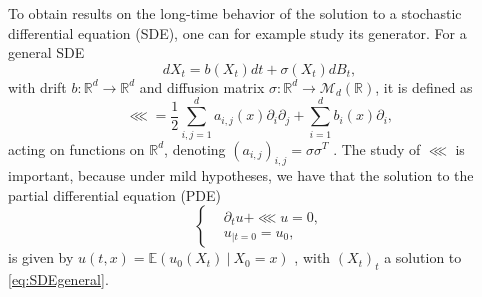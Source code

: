 \documentclass[12pt]{amsart}
\newcommand{\E}{\mathbb E}
\newcommand{\R}{\mathbb R}
\numberwithin{equation}{section}
\numberwithin{figure}{section}
\def\mmm{{\mathcal M}}\def\nnn{{\mathcal N}} \def\ooo{{\mathcal O}}\def\ppp{{\mathcal P}}
\begin{document}
To obtain results on the long-time behavior of the solution to a stochastic differential equation (SDE), one can for example study its %
generator. For a general SDE
\begin{equation}\label{eq:SDEgeneral}
dX_t = b(X_t)dt + \sigma(X_t)dB_t,
\end{equation}
with %
drift $b:\R^d\to\R^d$ and diffusion matrix $\sigma:\R^d\to\mmm_d(\R)$, it is defined as
\begin{equation*}
\lll = \frac12\sum_{i,j=1}^da_{i,j}(x)\partial_i\partial_j + \sum_{i=1}^db_i(x)\partial_i,
\end{equation*}
acting on functions on $\R^d$, denoting $(a_{i,j})_{i,j} = \sigma\sigma^T$%
. The study of $\lll$ is important, because under mild hypotheses, we have that the %
solution to the partial differential equation (PDE)
\begin{equation}\label{eq:FeynmanKac}
\left\{
\begin{aligned}
&\partial_tu+\lll u = 0,\\
&u_{|t=0}=u_0,
\end{aligned}
\right.
\end{equation}
is given by $u(t,x) = \E(u_0(X_t)\ |\ X_0=x)$%
, with $(X_t)_t$ %
a solution to \eqref{eq:SDEgeneral}.
\end{document}
